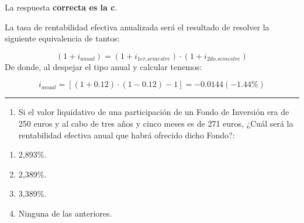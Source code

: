 \documentclass[
  letterpaper,
  DIV=11,
  numbers=noendperiod]{scrreprt}
\providecommand{\tightlist}{%
  \setlength{\itemsep}{0pt}\setlength{\parskip}{0pt}}\usepackage{longtable,booktabs,array}
\begin{document}
\begin{tcolorbox}[enhanced jigsaw, left=2mm, opacityback=0, colback=white, breakable, arc=.35mm, bottomrule=.15mm, rightrule=.15mm, toprule=.15mm, leftrule=.75mm, colframe=quarto-callout-tip-color-frame]
\begin{minipage}[t]{5.5mm}
\textcolor{quarto-callout-tip-color}{\faLightbulb}
\end{minipage}%
\begin{minipage}[t]{\textwidth - 5.5mm}

La respuesta \textbf{correcta es la c}.

La tasa de rentabilidad efectiva anualizada será el resultado de
resolver la siguiente equivalencia de tantos:

\[\left(1+i_{anual}\right)=\left(1+i_{1er.semestre}\right)\cdot\left(1+i_{2do.semestre}\right)\]
De donde, al despejar el tipo anual y calcular tenemos:

\[i_{anual}=\left[\left(1+0.12\right)\cdot\left(1-0.12\right)-1\right]=-0.0144(-1.44\%)\]

\end{minipage}%
\end{tcolorbox}

\begin{center}\rule{0.5\linewidth}{0.5pt}\end{center}

\begin{enumerate}
\def\labelenumi{\arabic{enumi}.}
\setcounter{enumi}{39}
\tightlist
\item
  Si el valor liquidativo de una participación de un Fondo de Inversión
  era de 250 euros y al cabo de tres años y cinco meses es de 271 euros,
  ¿Cuál será la rentabilidad efectiva anual que habrá ofrecido dicho
  Fondo?:
\end{enumerate}

\begin{enumerate}
\def\labelenumi{\alph{enumi})}
\item
  2,893\%.
\item
  2,389\%.
\item
  3,389\%.
\item
  Ninguna de las anteriores.
\end{enumerate}
\end{document}
